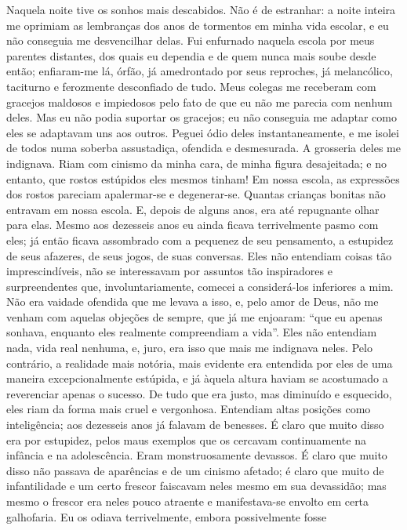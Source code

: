 Naquela noite tive os sonhos mais descabidos. Não é de estranhar: a
noite inteira me oprimiam as lembranças dos anos de tormentos em minha
vida escolar, e eu não conseguia me desvencilhar delas. Fui enfurnado
naquela escola por meus parentes distantes, dos quais eu dependia e de
quem nunca mais soube desde então; enfiaram-me lá, órfão, já
amedrontado por seus reproches, já melancólico, taciturno e ferozmente
desconfiado de tudo. Meus colegas me receberam com gracejos maldosos e
impiedosos pelo fato de que eu não me parecia com nenhum deles. Mas eu
não podia suportar os gracejos; eu não conseguia me adaptar como eles
se adaptavam uns aos outros. Peguei ódio deles instantaneamente, e me
isolei de todos numa soberba assustadiça, ofendida e desmesurada. A
grosseria deles me indignava. Riam com cinismo da minha cara, de minha
figura desajeitada; e no entanto, que rostos estúpidos eles mesmos
tinham! Em nossa escola, as expressões dos rostos pareciam apalermar-se
e degenerar-se. Quantas crianças bonitas não entravam em nossa escola.
E, depois de alguns anos, era até repugnante olhar para elas. Mesmo aos
dezesseis anos eu ainda ficava terrivelmente pasmo com eles; já então
ficava assombrado com a pequenez de seu pensamento, a estupidez de seus
afazeres, de seus jogos, de suas conversas. Eles não entendiam coisas
tão imprescindíveis, não se interessavam por assuntos tão inspiradores
e surpreendentes que, involuntariamente, comecei a considerá-los
inferiores a mim. Não era vaidade ofendida que me levava a isso, e,
pelo amor de Deus, não me venham com aquelas objeções de sempre, que já
me enjoaram: “que eu apenas sonhava, enquanto eles realmente
compreendiam a vida”. Eles não entendiam nada, vida real nenhuma, e,
juro, era isso que mais me indignava neles. Pelo contrário, a realidade
mais notória, mais evidente era entendida por eles de uma maneira
excepcionalmente estúpida, e já àquela altura haviam se acostumado a
reverenciar apenas o sucesso. De tudo que era justo, mas diminuído e
esquecido, eles riam da forma mais cruel e vergonhosa. Entendiam altas
posições como inteligência; aos dezesseis anos já falavam de benesses.
É claro que muito disso era por estupidez, pelos maus exemplos que os
cercavam continuamente na infância e na adolescência. Eram
monstruosamente devassos. É claro que muito disso não passava de
aparências e de um cinismo afetado; é claro que muito de infantilidade
e um certo frescor faiscavam neles mesmo em sua devassidão; mas mesmo o
frescor era neles pouco atraente e manifestava-se envolto em certa
galhofaria. Eu os odiava terrivelmente, embora possivelmente fosse
